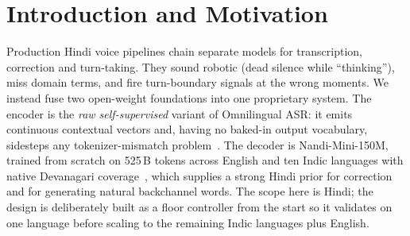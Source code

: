 \documentclass[11pt]{article}
\begin{document}
\section{Introduction and Motivation}
Production Hindi voice pipelines chain separate models for transcription, correction and
turn-taking. They sound robotic (dead silence while ``thinking''), miss domain terms, and
fire turn-boundary signals at the wrong moments. We instead fuse two open-weight
foundations into one proprietary system. The encoder is the \emph{raw self-supervised}
variant of Omnilingual ASR: it emits continuous contextual vectors and, having no baked-in
output vocabulary, sidesteps any tokenizer-mismatch problem~\cite{omni}. The decoder is
Nandi-Mini-150M, trained from scratch on 525\,B tokens across English and ten Indic
languages with native Devanagari coverage~\cite{nandi}, which supplies a strong Hindi
prior for correction and for generating natural backchannel words. The scope here is Hindi;
the design is deliberately built as a floor controller from the start so it validates on
one language before scaling to the remaining Indic languages plus English.
\end{document}
